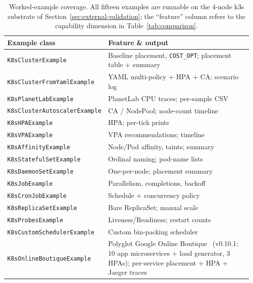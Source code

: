 \documentclass[ASNA,twocolumn]{USG}
\begin{document}
    \begin{table}[!t]
        \centering
        \caption{Worked-example coverage. All fifteen examples are runnable on
        the 4-node k3s substrate of Section~\ref{sec:external-validation}; the
        ``feature'' column refers to the capability dimension in
        Table~\ref{tab:comparison}.\label{tab:examples-coverage}}
        \footnotesize
        \begin{tabular*}{\columnwidth}{@{\extracolsep{\fill}}p{}p{}@{}}
\toprule
\textbf{Example class} & \textbf{Feature \& output} \\
\midrule
\texttt{K8sClusterExample}           & Baseline placement, \texttt{COST\_OPT}; placement table + summary \\
\texttt{K8sClusterFromYamlExample}   & YAML multi-policy + HPA + CA; scenario log \\
\texttt{K8sPlanetLabExample}         & PlanetLab CPU traces; per-sample CSV \\
\texttt{K8sClusterAutoscalerExample} & CA / NodePool; node-count timeline \\
\texttt{K8sHPAExample}               & HPA; per-tick prints \\
\texttt{K8sVPAExample}               & VPA recommendations; timeline \\
\texttt{K8sAffinityExample}          & Node/Pod affinity, taints; summary \\
\texttt{K8sStatefulSetExample}       & Ordinal naming; pod-name lists \\
\texttt{K8sDaemonSetExample}         & One-per-node; placement summary \\
\texttt{K8sJobExample}               & Parallelism, completions, backoff \\
\texttt{K8sCronJobExample}           & Schedule + concurrency policy \\
\texttt{K8sReplicaSetExample}        & Bare ReplicaSet; manual scale \\
\texttt{K8sProbesExample}            & Liveness/Readiness; restart counts \\
\texttt{K8sCustomSchedulerExample}   & Custom bin-packing scheduler \\
\texttt{K8sOnlineBoutiqueExample}    & Polyglot Google Online Boutique~\cite{OnlineBoutique2024} (v0.10.1: 10 app microservices + load generator, 3 HPAs); per-service placement + HPA + Jaeger traces \\
\bottomrule
        \end{tabular*}
    \end{table}
\end{document}
